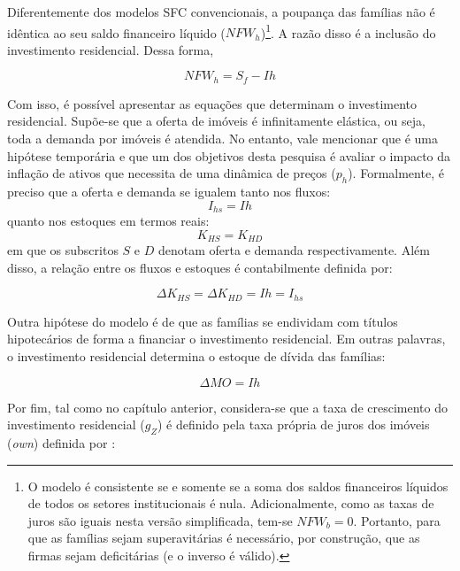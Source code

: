 Diferentemente dos modelos SFC convencionais, a poupança das famílias não é idêntica ao seu saldo financeiro líquido ($NFW_h$)\footnote{O modelo é consistente se e somente se a soma dos saldos financeiros líquidos de todos os setores institucionais é nula. Adicionalmente, como as taxas de juros são iguais nesta versão simplificada, tem-se $NFW_b = 0$. Portanto, para que as famílias sejam superavitárias é necessário, por construção, que as firmas sejam deficitárias (e o inverso é válido).
}. A razão disso é a inclusão do investimento residencial. Dessa forma, 

\begin{equation}
\label{NFWh}
    NFW_h = S_f - Ih
\end{equation}

Com isso, é possível apresentar as equações que determinam o investimento residencial. Supõe-se que a oferta de imóveis é infinitamente elástica, ou seja, toda a demanda por imóveis é atendida. No entanto, vale mencionar que é uma hipótese temporária e que um dos objetivos desta pesquisa é avaliar o impacto da inflação de ativos que necessita de uma dinâmica de preços ($p_h$). Formalmente, é preciso que a oferta e demanda se igualem tanto nos fluxos:
\begin{equation}
    I_{hs} = Ih
\end{equation}
quanto nos estoques em termos reais:
\begin{equation}
    K_{HS} = K_{HD}
\end{equation}
em que os subscritos $S$ e $D$ denotam oferta e demanda respectivamente. Além disso, a relação entre os fluxos e estoques é contabilmente definida por:

\begin{equation}
    \Delta K_{HS} = \Delta K_{HD} = Ih = I_{hs}
\end{equation}

Outra hipótese do modelo é de que as famílias se endividam com títulos hipotecários de forma a financiar o investimento residencial. Em outras palavras, o investimento residencial determina o estoque de dívida das famílias:

\begin{equation}
    \label{EqMO}
    \Delta MO = Ih
\end{equation}

Por fim, tal como no capítulo anterior, considera-se que a taxa de crescimento do investimento residencial ($g_Z$) é definido pela taxa própria de juros dos imóveis (\textit{own}) definida por \textcite{teixeira_crescimento_2015}:


